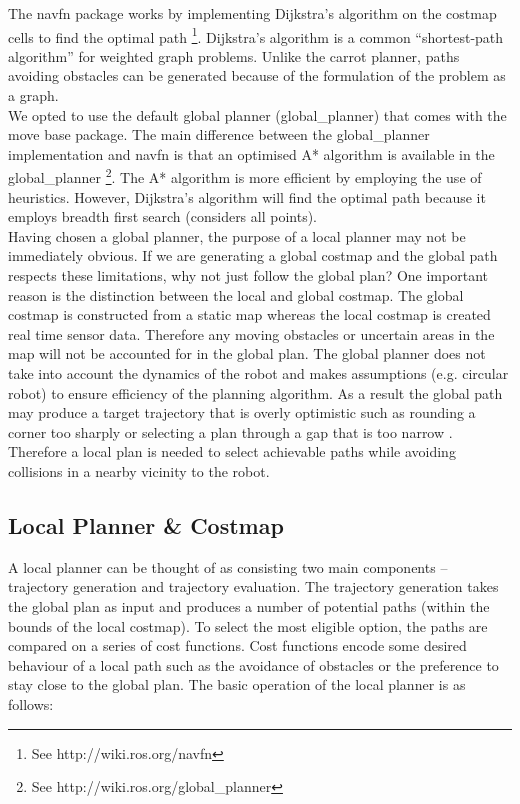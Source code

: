 \documentclass[capstone_report.tex]{subfiles}
\begin{document}
The navfn package works by implementing Dijkstra’s algorithm on the costmap cells to find the optimal path \footnote{See http://wiki.ros.org/navfn}.  Dijkstra’s algorithm is a common “shortest-path algorithm” for weighted graph problems.   Unlike the carrot planner, paths avoiding obstacles can be generated because of the formulation of the problem as a graph.\\

We opted to use the default global planner (global\_planner) that comes with the move base package.  The main difference between the global\_planner implementation and navfn is that an optimised A* algorithm is available in the global\_planner \footnote{See http://wiki.ros.org/global\_planner}.  The A* algorithm is more efficient by employing the use of heuristics.  However, Dijkstra’s algorithm will find the optimal path because it employs breadth first search (considers all points).\\

Having chosen a global planner, the purpose of a local planner may not be immediately obvious.  If we are generating a global costmap and the global path respects these limitations, why not just follow the global plan?  One important reason is the distinction between the local and global costmap.  The global costmap is constructed from a static map whereas the local costmap is created real time sensor data.  Therefore any moving obstacles or uncertain areas in the map will not be accounted for in the global plan.  The global planner does not take into account the dynamics of the robot and makes assumptions (e.g. circular robot) to ensure efficiency of the planning algorithm.  As a result the global path may produce a target trajectory that is overly optimistic such as rounding a corner too sharply or selecting a plan through a gap that is too narrow \cite{marder2010office}.  Therefore a local plan is needed to select achievable paths while avoiding collisions in a nearby vicinity to the robot.

\subsection{Local Planner \& Costmap}

A local planner can be thought of as consisting two main components – trajectory generation and trajectory evaluation.  The trajectory generation takes the global plan as input and produces a number of potential paths (within the bounds of the local costmap).  To select the most eligible option, the paths are compared on a series of cost functions.   Cost functions encode some desired behaviour of a local path such as the avoidance of obstacles or the preference to stay close to the global plan.  The basic operation of the local planner is as follows:
\end{document}
